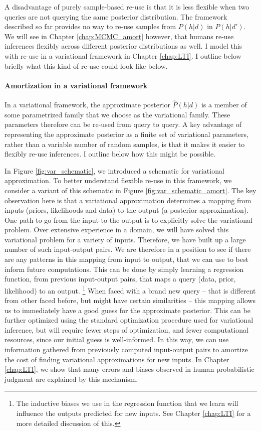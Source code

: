 A disadvantage of purely sample-based re-use is that it is less flexible when two queries are not querying the same posterior distribution. The framework described so far provides no way to re-use samples from $P(h | d)$ in $P(h | d')$. We will see in Chapter \ref{chap:MCMC_amort} however, that humans re-use inferences flexibly across different posterior distributions as well. I model this with re-use in a variational framework in Chapter \ref{chap:LTI}. I outline below briefly what this kind of re-use could look like below.

\paragraph{Amortization in a variational framework} 

In a variational framework, the approximate posterior $\hat{P}(h | d)$ is a member of some parametrized family that we choose as the variational family. These parameters therefore can be re-used from query to query. A key advantage of representing the approximate posterior as a finite set of variational parameters, rather than a variable number of random samples, is that it makes it easier to flexibly re-use inferences. I outline below how this might be possible.

In Figure \ref{fig:var_schematic}, we introduced a schematic for variational approximation. To better understand flexible re-use in this framework, we consider a variant of this schematic in Figure \ref{fig:var_schematic_amort}. The key observation here is that a variational approximation determines a mapping from inputs (priors, likelihoods and data) to the output (a posterior approximation). One path to go from the input to the output is to explicitly solve the variational problem. Over extensive experience in a domain, we will have solved this variational problem for a variety of inputs. Therefore, we have built up a large number of such input-output pairs. We are therefore in a position to see if there are any patterns in this mapping from input to output, that we can use to best inform future computations. This can be done by simply learning a regression function, from previous input-output pairs, that maps a query (data, prior, likelihood) to an output. \footnote{The inductive biases we use in the regression function that we learn will influence the outputs predicted for new inputs. See Chapter \ref{chap:LTI} for a more detailed discussion of this.} When faced with a brand new query -- that is different from other faced before, but might have certain similarities -- this mapping allows us to immediately have a good guess for the approximate posterior. This can be further optimized using the standard optimization procedure used for variational inference, but will require fewer steps of optimization, and fewer computational resources, since our initial guess is well-informed. In this way, we can use information gathered from previously computed input-output pairs to amortize the cost of finding variational approximations for new inputs. In Chapter \ref{chap:LTI}, we show that many errors and biases observed in human probabilistic judgment are explained by this mechanism.

